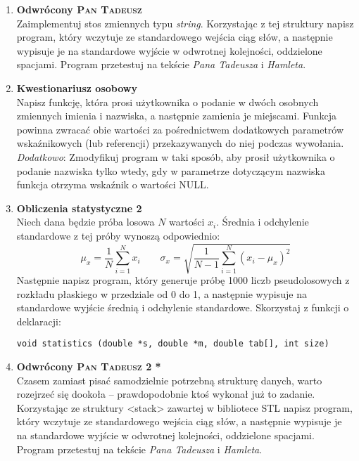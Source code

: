 \documentclass[12pt]{article}
\begin{document}
\begin{enumerate}
\item \textbf{Odwrócony \textsc{Pan Tadeusz}}\\
Zaimplementuj stos zmiennych typu \textit{string}. Korzystając z tej struktury napisz program, który wczytuje ze standardowego wejścia ciąg słów, a następnie wypisuje je na standardowe wyjście w odwrotnej kolejności, oddzielone spacjami. Program przetestuj na tekście \textit{Pana Tadeusza} i \textit{Hamleta}.

\newpage
{}

\item \textbf{Kwestionariusz osobowy}\\
Napisz funkcję, która prosi użytkownika o podanie w dwóch osobnych zmiennych imienia i nazwiska, a następnie zamienia je miejscami. Funkcja powinna zwracać obie wartości za pośrednictwem dodatkowych parametrów wskaźnikowych (lub referencji) przekazywanych do niej podczas wywołania. \textit{Dodatkowo}: Zmodyfikuj program w taki sposób, aby prosił użytkownika o podanie nazwiska tylko wtedy, gdy w parametrze dotyczącym nazwiska funkcja otrzyma wskaźnik o wartości \textsc{NULL}.

\item \textbf{Obliczenia statystyczne 2}\\
Niech dana będzie próba losowa $N$ wartości $x_i$. Średnia i odchylenie standardowe z tej próby wynoszą odpowiednio:
\[
\mu_x=\frac{1}{N}\sum_{i=1}^{N} x_i \quad \quad \sigma_x=\sqrt{\frac{1}{N-1}\sum_{i=1}^{N}(x_i-\mu_x)^2}
\]
Następnie napisz program, który generuje próbę 1000 liczb pseudolosowych z rozkładu płaskiego w przedziale od 0 do 1, a następnie wypisuje na standardowe wyjście średnią i odchylenie standardowe. Skorzystaj z funkcji o deklaracji:
\begin{verbatim}
void statistics (double *s, double *m, double tab[], int size)
\end{verbatim}

\item \textbf{Odwrócony \textsc{Pan Tadeusz} 2 *}\\
Czasem zamiast pisać samodzielnie potrzebną strukturę danych, warto rozejrzeć się dookoła -- prawdopodobnie ktoś wykonał już to zadanie. Korzystając ze struktury <stack> zawartej w bibliotece STL napisz program, który wczytuje ze standardowego wejścia ciąg słów, a następnie wypisuje je na standardowe wyjście w odwrotnej kolejności, oddzielone spacjami. Program przetestuj na tekście \textit{Pana Tadeusza} i \textit{Hamleta}.


\end{enumerate}
\end{document}
